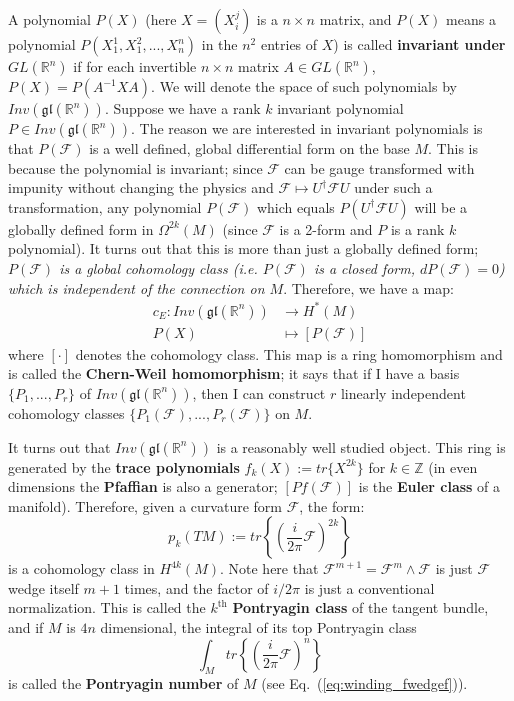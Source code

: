 \documentclass[11pt, oneside]{article}   	%
\theoremstyle{definition}
\newenvironment{answer}{\begin{center}\begin{answerbox}}{\end{answerbox}\end{center}}
\begin{document}
\begin{answer}
\begin{flushleft}
	A polynomial $P(X)$ (here $X = (X_i^j)$ is a $n\times n$ matrix, and $P(X)$ means a polynomial $P(X_1^1, X_1^2, ..., X_n^n)$ in the 
	$n^2$ entries of $X$) is called \textbf{invariant under $GL(\mathbb R^n)$} if for each invertible $n\times n$ matrix $A\in GL(\mathbb 
	R^n)$, $P(X) = P(A^{-1} X A)$. We will denote the space of such polynomials by $Inv(\mathfrak{gl}(\mathbb R^n))$. Suppose we 
	have a rank $k$ invariant polynomial $P\in Inv(\mathfrak{gl}(\mathbb R^n))$. The reason we are interested in invariant polynomials is 
	that $P(\mathcal F)$ is a well defined, global differential form on the base $M$. This is because the polynomial is invariant; since 
	$\mathcal F$ can be gauge transformed with impunity without changing the physics and $\mathcal F\mapsto U^\dagger \mathcal F
	U$ under such a transformation, any polynomial $P(\mathcal F)$ which equals $P(U^\dagger \mathcal F U)$ will be a globally 
	defined form in $\Omega^{2k}(M)$ (since $\mathcal F$ is a 2-form and $P$ is a rank $k$ polynomial). It turns out that 
	this is more than just a globally defined form; \textit{$P(\mathcal F)$ is a global cohomology class (i.e. $P(\mathcal F)$ is a closed 
	form, $dP(\mathcal F) = 0$) which is independent of the connection on $M$}. Therefore, we have a map:
	\begin{align}
		c_E : Inv(\mathfrak{gl}(\mathbb R^n))&\rightarrow H^*(M) \\
		P(X)&\mapsto [P(\mathcal F)]
	\end{align} 
	where $[\cdot]$ denotes the cohomology class. This map is a ring homomorphism and is called the \textbf{Chern-Weil homomorphism}; 
	it says that if I have a basis $\{P_1, ..., P_r\}$ of $Inv(\mathfrak{gl}(\mathbb R^n))$, then I can construct $r$ linearly independent 
	cohomology classes $\{P_1(\mathcal F), ..., P_r(\mathcal F)\}$ on $M$. 
	
	It turns out that $Inv(\mathfrak{gl}(\mathbb R^n))$ is a reasonably well studied object. This ring is generated by the \textbf{trace 
	polynomials} $f_k(X) := tr\{X^{2k}\}$ for $k\in\mathbb Z$ (in even dimensions the \textbf{Pfaffian} is also a generator; $[Pf(\mathcal F)]$ 
	is the \textbf{Euler class} of a manifold). Therefore, given a curvature form $\mathcal F$, the form:
	\begin{equation}
		p_k(TM) := tr\left\{\left(\frac{i}{2\pi}\mathcal F\right)^{2k}\right\}
	\end{equation}
	is a cohomology class in $H^{4k}(M)$. Note here that $\mathcal F^{m + 1} = \mathcal F^m\wedge\mathcal F$ is just $\mathcal F$ 
	wedge itself $m + 1$ times, and the factor of $i / 2\pi$ is just a conventional normalization. This is called the $k^\mathrm{th}$ 
	\textbf{Pontryagin class} of the tangent bundle, and if $M$ is $4n$ dimensional, the integral of its top Pontryagin class 
	\begin{equation}
		\int_M tr\left\{\left(\frac{i}{2\pi}\mathcal F\right)^n\right\}
	\end{equation}
	is called the \textbf{Pontryagin number} of $M$ (see Eq.~(\ref{eq:winding_fwedgef})). 
	
	\end{flushleft}
\end{answer}
\end{document}
